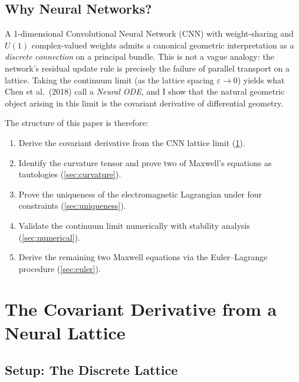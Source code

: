 \documentclass[12pt, a4paper]{article}
\theoremstyle{plain}
\theoremstyle{definition}
\theoremstyle{remark}
\newcommand{\eps}{\varepsilon}
\begin{document}
\subsection{Why Neural Networks?}

A 1-dimensional Convolutional Neural Network (CNN) with weight-sharing and $U(1)$ complex-valued weights admits a canonical geometric interpretation as a \emph{discrete connection} on a principal bundle.  This is not a vague analogy: the network's residual update rule is precisely the failure of parallel transport on a lattice.  Taking the continuum limit (as the lattice spacing $\eps \to 0$) yields what Chen et al.\ (2018) call a \emph{Neural ODE}, and I show that the natural geometric object arising in this limit is the covariant derivative of differential geometry.

The structure of this paper is therefore:

\begin{enumerate}[label=\textbf{\arabic*.}]
  \item Derive the covariant derivative from the CNN lattice limit (\cref{sec:covariant}).
  \item Identify the curvature tensor and prove two of Maxwell's equations as tautologies (\cref{sec:curvature}).
  \item Prove the uniqueness of the electromagnetic Lagrangian under four constraints (\cref{sec:uniqueness}).
  \item Validate the continuum limit numerically with stability analysis (\cref{sec:numerical}).
  \item Derive the remaining two Maxwell equations via the Euler–Lagrange procedure (\cref{sec:euler}).
\end{enumerate}

\section{The Covariant Derivative from a Neural Lattice}
\label{sec:covariant}

\subsection{Setup: The Discrete Lattice}
\end{document}
